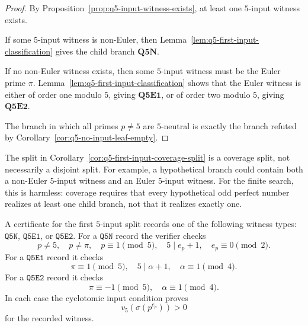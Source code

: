 \begin{proof}
By Proposition~\ref{prop:q5-input-witness-exists}, at least one $5$-input
witness exists.

If some $5$-input witness is non-Euler, then
Lemma~\ref{lem:q5-first-input-classification} gives the child branch
\(\mathbf{Q5N}\).

If no non-Euler witness exists, then some $5$-input witness must be the Euler
prime $\pi$.  Lemma~\ref{lem:q5-first-input-classification} shows that the Euler
witness is either of order one modulo \(5\), giving \(\mathbf{Q5E1}\), or of
order two modulo \(5\), giving \(\mathbf{Q5E2}\).

The branch in which all primes $p\ne5$ are $5$-neutral is exactly the branch
refuted by Corollary~\ref{cor:q5-no-input-leaf-empty}.
\end{proof}

\begin{remark}
The split in Corollary~\ref{cor:q5-first-input-coverage-split} is a coverage
split, not necessarily a disjoint split.  For example, a hypothetical branch
could contain both a non-Euler $5$-input witness and an Euler $5$-input witness.
For the finite search, this is harmless: coverage requires that every
hypothetical odd perfect number realizes at least one child branch, not that it
realizes exactly one.
\end{remark}

\begin{remark}
A certificate for the first $5$-input split records one of the following witness
types: \(\mathtt{Q5N}\), \(\mathtt{Q5E1}\), or \(\mathtt{Q5E2}\).
For a \(\mathtt{Q5N}\) record the verifier checks
\[
  p\ne5,\quad p\ne\pi,\quad p\equiv1\pmod5,\quad 5\mid e_p+1,
  \quad e_p\equiv0\pmod2.
\]
For a \(\mathtt{Q5E1}\) record it checks
\[
  \pi\equiv1\pmod5,\quad 5\mid\alpha+1,\quad \alpha\equiv1\pmod4.
\]
For a \(\mathtt{Q5E2}\) record it checks
\[
  \pi\equiv-1\pmod5,\quad \alpha\equiv1\pmod4.
\]
In each case the cyclotomic input condition proves
\[
  v_5(\sigma(p^{e_p}))>0
\]
for the recorded witness.
\end{remark}

